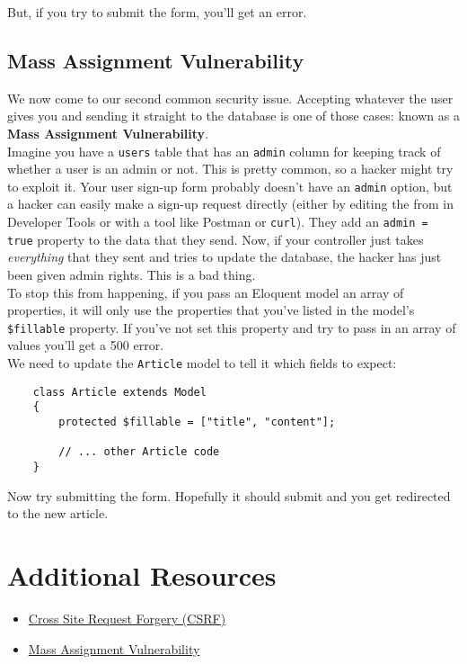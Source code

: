 But, if you try to submit the form, you'll get an error.


\subsection{Mass Assignment Vulnerability}

We now come to our second common security issue. Accepting whatever the user gives you and sending it straight to the database is one of those cases: known as a \textbf{Mass Assignment Vulnerability}.
\\

Imagine you have a \texttt{users} table that has an \texttt{admin} column for keeping track of whether a user is an admin or not. This is pretty common, so a hacker might try to exploit it. Your user sign-up form probably doesn't have an \texttt{admin} option, but a hacker can easily make a sign-up request directly (either by editing the from in Developer Tools or with a tool like Postman or \texttt{curl}). They add an \texttt{admin = true} property to the data that they send. Now, if your controller just takes \textit{everything} that they sent and tries to update the database, the hacker has just been given admin rights. This is a bad thing.
\\

To stop this from happening, if you pass an Eloquent model an array of properties, it will only use the properties that you've listed in the model's \texttt{\$fillable} property. If you've not set this property and try to pass in an array of values you'll get a 500 error.
\\

We need to update the \texttt{Article} model to tell it which fields to expect:

\begin{verbatim}
    class Article extends Model
    {
        protected $fillable = ["title", "content"];

        // ... other Article code
    }
\end{verbatim}

Now try submitting the form. Hopefully it should submit and you get redirected to the new article.


\section{Additional Resources}

\begin{itemize}[leftmargin=*]
    \item \href{https://owasp.org/www-community/attacks/csrf}{Cross Site Request Forgery (CSRF)}
    \item \href{https://cheatsheetseries.owasp.org/cheatsheets/Mass_Assignment_Cheat_Sheet.html}{Mass Assignment Vulnerability}
\end{itemize}
